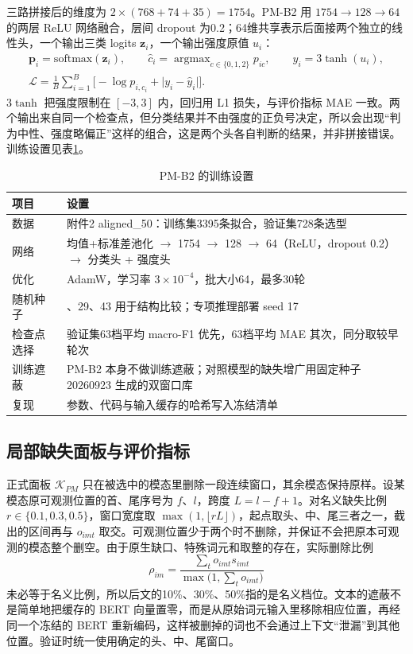 三路拼接后的维度为 $2\times(768+74+35)=1754$。PM-B2 用 $1754\to128\to64$ 的两层 ReLU 网络融合，层间 dropout 为0.2；64维共享表示后面接两个独立的线性头，一个输出三类 logits $\boldsymbol z_i$，一个输出强度原值 $u_i$：
\begin{equation}\label{eq:heads}
\begin{gathered}
\boldsymbol p_i=\mathrm{softmax}(\boldsymbol z_i),\qquad \hat c_i=\mathop{\arg\max}_{c\in\{0,1,2\}}p_{ic},\qquad
\hat y_i=3\tanh(u_i),\\
\mathcal{L}=\frac{1}{B}\sum_{i=1}^{B}\Big[-\log p_{i,c_i}+\big|y_i-\hat y_i\big|\Big].
\end{gathered}
\end{equation}
$3\tanh$ 把强度限制在 $[-3,3]$ 内，回归用 L1 损失，与评价指标 MAE 一致。两个输出来自同一个检查点，但分类结果并不由强度的正负号决定，所以会出现“判为中性、强度略偏正”这样的组合，这是两个头各自判断的结果，并非拼接错误。训练设置见表\ref{tab:q2train}。

\begin{table}[htbp]
\centering
\caption{PM-B2 的训练设置}
\label{tab:q2train}
\begin{tabularx}{\textwidth}{l>{\raggedright\arraybackslash}X}
\toprule
项目 & 设置 \\
\midrule
数据 & 附件2 aligned\_50：训练集3395条拟合，验证集728条选型 \\
网络 & 均值+标准差池化 $\to$ 1754 $\to$ 128 $\to$ 64（ReLU，dropout 0.2）$\to$ 分类头 + 强度头 \\
优化 & AdamW，学习率 $3\times10^{-4}$，批大小64，最多30轮 \\
随机种子 & 17、29、43 用于结构比较；专项推理部署 seed 17 \\
检查点选择 & 验证集63档平均 macro-F1 优先，63档平均 MAE 其次，同分取较早轮次 \\
训练遮蔽 & PM-B2 本身不做训练遮蔽；对照模型的缺失增广用固定种子 20260923 生成的双窗口库 \\
复现 & 参数、代码与输入缓存的哈希写入冻结清单 \\
\bottomrule
\end{tabularx}
\end{table}

\subsection{局部缺失面板与评价指标}\label{sec:panel}

正式面板 $\mathcal{K}_{PM}$ 只在被选中的模态里删除一段连续窗口，其余模态保持原样。设某模态原可观测位置的首、尾序号为 $f$、$l$，跨度 $L=l-f+1$。对名义缺失比例 $r\in\{0.1,0.3,0.5\}$，窗口宽度取 $\max(1,\lfloor rL\rfloor)$，起点取头、中、尾三者之一，截出的区间再与 $o_{imt}$ 取交。可观测位置少于两个时不删除，并保证不会把原本可观测的模态整个删空。由于原生缺口、特殊词元和取整的存在，实际删除比例
\begin{equation}\label{eq:rho}
\rho_{im}=\frac{\sum_t o_{imt}s_{imt}}{\max\!\big(1,\sum_t o_{imt}\big)}
\end{equation}
未必等于名义比例，所以后文的10\%、30\%、50\%指的是名义档位。文本的遮蔽不是简单地把缓存的 BERT 向量置零，而是从原始词元输入里移除相应位置，再经同一个冻结的 BERT 重新编码，这样被删掉的词也不会通过上下文“泄漏”到其他位置。验证时统一使用确定的头、中、尾窗口。

